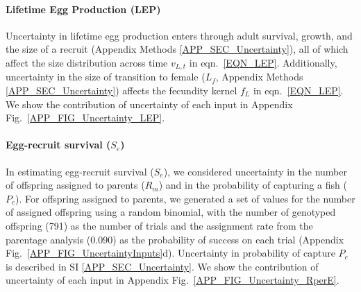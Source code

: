 \documentclass[12pt, oneside]{article}   	%
\begin{document}
\paragraph*{Lifetime Egg Production (LEP)} %

Uncertainty in lifetime egg production enters through adult survival, growth, and the size of a recruit (Appendix Methods \ref{APP_SEC_Uncertainty}), all of which affect the size distribution across time $v_{L,t}$ in eqn.\ \ref{EQN_LEP}. Additionally, uncertainty in the size of transition to female ($L_f$, Appendix Methods \ref{APP_SEC_Uncertainty}) affects the fecundity kernel $f_L$ in eqn.\ \ref{EQN_LEP}. We show the contribution of uncertainty of each input in Appendix Fig.\ \ref{APP_FIG_Uncertainty_LEP}.

\paragraph*{Egg-recruit survival ($S_e$)} %

In estimating egg-recruit survival ($S_e$), we considered uncertainty in the number of offspring assigned to parents ($R_m$) and in the probability of capturing a fish ($P_c$). For offspring assigned to parents, we generated a set of values for the number of assigned offspring using a random binomial, with the number of genotyped offspring (791) as the number of trials and the assignment rate from the parentage analysis (0.090) as the probability of success on each trial \citep{catalanoInPrepconnectivity} (Appendix Fig.\ \ref{APP_FIG_UncertaintyInputs}d). Uncertainty in probability of capture $P_c$ is described in SI \ref{APP_SEC_Uncertainty}. We show the contribution of uncertainty of each input in Appendix Fig.\ \ref{APP_FIG_Uncertainty_RperE}.


\end{document}
